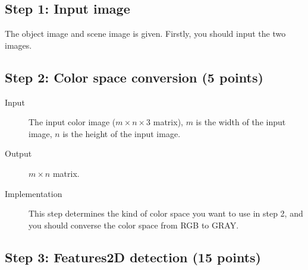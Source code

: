 \documentclass[12pt]{article}
\begin{document}
\subsection{Step 1: Input image}

The object image and scene image is given. Firstly, you should input the two images.

\subsection{Step 2: Color space conversion (5 points)}

\begin{description}
\item[Input] The input color image ($m \times n \times 3$ matrix), $m$ is the width of the input image, $n$ is the height of the input image.
\item[Output] $m \times n$ matrix. 
\item[Implementation] This step determines the kind of color space you want to use in step 2, and you should converse the color space from RGB to GRAY.
\end{description}

\subsection{Step 3: Features2D detection (15 points)}
\end{document}
